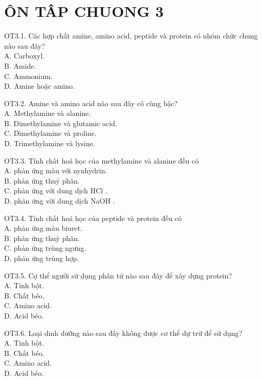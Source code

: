 \documentclass[10pt]{article}
\begin{document}
\section*{ÔN TÂP CHUONG 3}
OT3.1. Các hợp chất amine, amino acid, peptide và protein có nhóm chức chung nào sau đây?\\
A. Carboxyl.\\
B. Amide.\\
C. Ammonium.\\
D. Amine hoặc amino.

OT3.2. Amine và amino acid nào sau đây có cùng bậc?\\
A. Methylamine và alanine.\\
B. Dimethylamine và glutamic acid.\\
C. Dimethylamine và proline.\\
D. Trimethylamine và lysine.

OT3.3. Tính chất hoá học của methylamine và alanine đều có\\
A. phản ứng màu với nynhydrin.\\
B. phản ứng thuỷ phân.\\
C. phản ứng với dung dịch HCl .\\
D. phản ứng với dung dịch NaOH .

OT3.4. Tính chất hoá học của peptide và protein đều có\\
A. phản ứng màu biuret.\\
B. phản ứng thuỷ phân.\\
C. phản ứng trùng ngưng.\\
D. phản ứng trùng hợp.

OT3.5. Cợ thể người sử dụng phân tử nào sau đây để xây dựng protein?\\
A. Tinh bột.\\
B. Chất béo.\\
C. Amino acid.\\
D. Acid béo.

OT3.6. Loại dinh dưỡng nào sau đây không được cơ thể dự trữ để sử dụng?\\
A. Tinh bột.\\
B. Chất béo.\\
C. Amino acid.\\
D. Acid béo.
\end{document}
